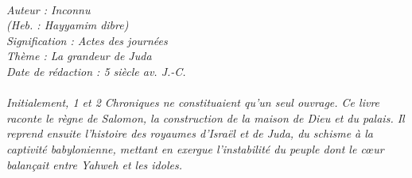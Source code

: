 \BFont
\noindent\hrulefill
{\footnotesize
\textit{
\bigskip
{\centering{}
\\Auteur : Inconnu
\\(Heb. : Hayyamim dibre)
\\Signification : Actes des journées
\\Thème : La grandeur de Juda
\\Date de rédaction : 5 siècle av. J.-C.\\}
}
\textit{
\\Initialement, 1 et 2 Chroniques ne constituaient qu'un seul ouvrage. Ce livre raconte le règne de Salomon, la construction de la maison de Dieu et du palais. Il reprend ensuite l'histoire des royaumes d'Israël et de Juda, du schisme à la captivité babylonienne, mettant en exergue l'instabilité du peuple dont le cœur balançait entre Yahweh et les idoles.\bigskip
}
}
\par\nobreak\noindent\hrulefill
